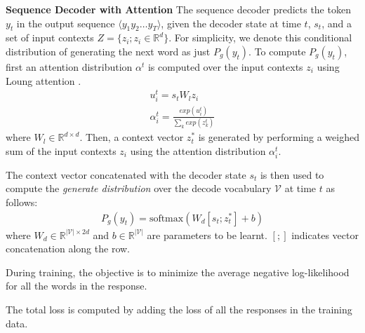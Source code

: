 \noindent\textbf{Sequence Decoder with Attention}
\label{ssec:rnndecoder}
The sequence decoder predicts the token $y_t$ in the output sequence $\langle y_1  y_2  \ldots  y_T \rangle$, given the decoder state at time $t$, $s_t$, and a set of input contexts $Z=\{z_i ; z_i \in \mathbb{R}^{d}\}$. For simplicity, we denote this conditional distribution of generating the next word as just $P_g(y_t)$. To compute $P_g(y_t)$, first an attention distribution $\alpha^t$ is computed over the input contexts $z_i$ using Loung attention \cite{luong2015effective}. 
\begin{gather}
u_i^t = s_t W_l z_i \\
\alpha_i^t = \frac{exp(u_i^t)}{\sum\nolimits_{k}exp(z_k^t)} \label{eq:memattn}
\end{gather}
where $W_l \in \mathbb{R}^{d \times d}$. Then, a context vector $z^*_t$ is generated by performing a weighed sum of the input contexts $z_i$ using the attention distribution $\alpha^t_i$.

The context vector concatenated with the decoder state $s_t$ is then used to compute the \textit{generate distribution} over the decode vocabulary $\mathcal{V}$ at time $t$ as follows:
\begin{gather}
P_{g}(y_t)= \text{softmax}( W_d [s_t;z^*_t] + b )
\end{gather}
where $W_d \in \mathbb{R}^{|\mathcal{V}| \times 2d}$ and $b \in \mathbb{R}^{|\mathcal{V}|}$ are parameters to be learnt.  $[;]$ indicates vector concatenation along the row.

During training, the objective is to minimize the average negative log-likelihood for all the words in the response.

The total loss is computed by adding the loss of all the responses in the training data.
